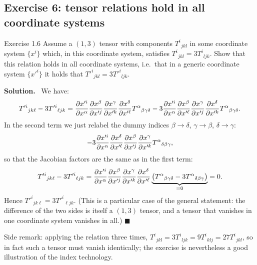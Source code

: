 \documentclass[11pt,a4paper]{article}
\numberwithin{equation}{subsection}
\newenvironment{solution}{\par\noindent\textbf{\textcolor{excol!70!black}{Solution.}}\ }{\hfill$\blacksquare$\par\medskip}
\newcommand{\added}[1]{{\color{teal!60!black}#1}}
\begin{document}
\subsection{Exercise 6: tensor relations hold in all coordinate systems}
\begin{problem}{Exercise 1.6}
Assume a $(1,3)$ tensor with components $T^i{}_{jkl}$ in some coordinate system $\{x^i\}$ which, in this coordinate system, satisfies $T^i{}_{jkl}=3T^i{}_{ljk}$. Show that this relation holds in all coordinate systems, i.e.\ that in a generic coordinate system $\{x'^i\}$ it holds that $T'^i{}_{jkl}=3T'^i{}_{ljk}$.
\end{problem}
\begin{solution}
We have:
\[
  T'^i{}_{jk\ell}-3T'^i{}_{\ell jk}=\frac{\partial x'^i}{\partial x^\alpha}\frac{\partial x^\beta}{\partial x'^j}\frac{\partial x^\gamma}{\partial x'^k}\frac{\partial x^\delta}{\partial x'^\ell}T^\alpha{}_{\beta\gamma\delta}
  -3\frac{\partial x'^i}{\partial x^\alpha}\frac{\partial x^\beta}{\partial x'^\ell}\frac{\partial x^\gamma}{\partial x'^j}\frac{\partial x^\delta}{\partial x'^k}T^\alpha{}_{\beta\gamma\delta}.
\]
In the second term we just relabel the dummy indices $\beta\to\delta$, $\gamma\to\beta$, $\delta\to\gamma$:
\[
  -3\frac{\partial x'^i}{\partial x^\alpha}\frac{\partial x^\delta}{\partial x'^\ell}\frac{\partial x^\beta}{\partial x'^j}\frac{\partial x^\gamma}{\partial x'^k}T^\alpha{}_{\delta\beta\gamma},
\]
so that the Jacobian factors are the same as in the first term:
\[
  T'^i{}_{jk\ell}-3T'^i{}_{\ell jk}=\frac{\partial x'^i}{\partial x^\alpha}\frac{\partial x^\beta}{\partial x'^j}\frac{\partial x^\gamma}{\partial x'^k}\frac{\partial x^\delta}{\partial x'^\ell}\underbrace{\big(T^\alpha{}_{\beta\gamma\delta}-3T^\alpha{}_{\delta\beta\gamma}\big)}_{=0}=0 .
\]
Hence $T'^i{}_{jk\ell}=3T'^i{}_{\ell jk}$. (This is a particular case of the general statement: the difference of the two sides is itself a $(1,3)$ tensor, and a tensor that vanishes in one coordinate system vanishes in all.)
\end{solution}
\added{Side remark: applying the relation three times, $T^i{}_{jkl}=3T^i{}_{ljk}=9T^i{}_{klj}=27T^i{}_{jkl}$, so in fact such a tensor must vanish identically; the exercise is nevertheless a good illustration of the index technology.}
\end{document}
